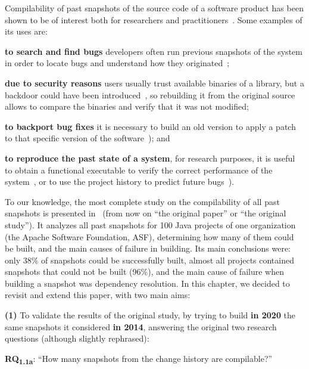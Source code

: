 Compilability of past snapshots of the source code of a software product has been shown to be of interest both for researchers and practitioners~\cite{nikitin2017chainiac,RepBlds:2017:Online}. 
Some examples of its uses are:
\begin{inparaenum}[\bf(1)]
	\item {\bf to search and find bugs} developers often run previous snapshots of the system in order to locate bugs and understand how they originated~\cite{Zimmermann:2006:MVA:1137983.1138001};
	\item {\bf due to security reasons} users usually trust available binaries of a library, but a backdoor could have been introduced~\cite{deCarnedeCarnavalet:2014:CIV:2664243.2664288}, so rebuilding it from the original source allows to compare the binaries and verify that it was not modified; 
	\item {\bf to backport bug fixes} it is necessary to build an old version to apply a patch to that specific version of the software~\cite{tian2017mining}); and
	\item {\bf to reproduce the past state of a system}, for research purposes, it is useful to obtain a functional executable to verify the correct performance of the system~\cite{manacero2011using}, or to use the project history to predict future bugs~\cite{Zimmermann2008}).
\end{inparaenum}

To our knowledge, the most complete study on the compilability of all past snapshots is presented in~\cite{tufano2017there} (from now on ``the original paper'' or ``the original study''). It analyzes all past snapshots for 100 Java projects of one organization (the Apache Software Foundation, ASF), determining how many of them could be built, and the main causes of failure in building. Its main conclusions were: only 38\% of snapshots could be successfully built, almost all projects contained snapshots that could not be built (96\%), and the main cause of failure when building a snapshot was dependency resolution. In this chapter, we decided to revisit and extend this paper, with two main aims:

\textbf{(1)} To validate the results of the original study, by trying to build {\bf in 2020} the same snapshots it considered {\bf in 2014}, answering the original two research questions (although slightly rephrased):

\textbf{RQ\textsubscript{1.1a}}: ``How many snapshots from the change history are compilable?''

